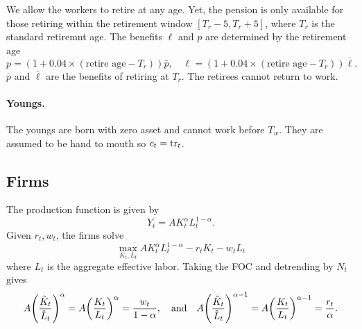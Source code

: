 \documentclass[a4paper, 12pt]{article}
\begin{document}
We allow the workers to retire at any age. Yet, the pension is 
only available for those retiring within the retirement window 
$[T_r-5, T_r+5]$, where $T_r$ is the standard retiremnt 
age. The benefits $\ell$ and $p$ are determined by 
the retirement age
\begin{equation}
    p = (1+0.04\times (\text{retire age} - T_r))\bar{p}, \quad 
    \ell = (1+0.04\times (\text{retire age} - T_r))\bar{\ell}.
\end{equation}
$\bar{p}$ and $\bar{\ell}$ are the benefits of 
retiring at $T_r$. The retirees cannot return to 
work.

\paragraph{Youngs.}
The youngs are born with zero asset and cannot work before $T_w$. 
They are assumed to be hand to mouth so $c_t = \mathrm{tr}_t$. 

\subsection{Firms}
The production function is given by 
\begin{equation}
    Y_t = AK_t^\alpha L_t^{1-\alpha}.
\end{equation}
Given $r_t, w_t$, the firms solve 
\begin{equation}
    \max_{K_t, L_t}AK_t^\alpha L_t^{1-\alpha} - r_tK_t - w_tL_t
\end{equation}
where $L_t$ is the aggregate effective labor. Taking the FOC and 
detrending by $N_t$ gives 
\begin{equation}
    A\pth{\frac{\hat{K}_t}{\hat{L}_t}}^\alpha = A\pth{\frac{K_t}{L_t}}^\alpha = \frac{w_t}{1-\alpha}, \quad \text{and}\quad
    A\pth{\frac{\hat{K}_t}{\hat{L}_t}}^{\alpha-1} = A\pth{\frac{K_t}{L_t}}^{\alpha-1} = \frac{r_t}{\alpha}.
\end{equation}
\end{document}
